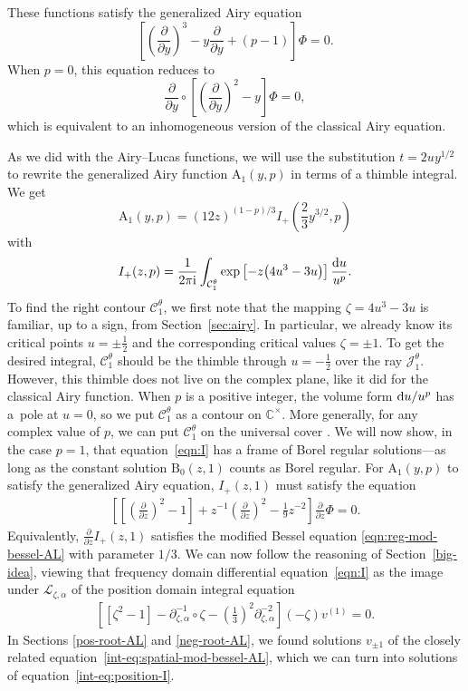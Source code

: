 \documentclass[10pt,a4paper]{amsart}
\newcommand{\C}{\mathbb{C}}
\newcommand{\fracderiv}[3]{\partial^{#1}_{#2, #3}}
\newcommand{\laplace}{\mathcal{L}}
\numberwithin{equation}{section}
\begin{document}
\noindent
These functions satisfy the generalized Airy equation
\[ \left[\left(\frac{\partial}{\partial y}\right)^3 - y \frac{\partial}{\partial y} + (p-1)\right] \Phi = 0. \]
When $p = 0$, this equation reduces to
\[ \frac{\partial}{\partial y} \circ \left[\left(\frac{\partial}{\partial y}\right)^2 - y\right] \Phi = 0, \]
which is equivalent to an inhomogeneous version of the classical Airy equation.



As we did with the Airy--Lucas functions, we will use the substitution $t = 2uy^{1/2}$ to rewrite the generalized Airy function $\mathrm{A}_1(y,p)$ in terms of a thimble integral. We get
\[ \mathrm{A}_1(y,p) = (12 z)^{(1-p)/3} I_+\left(\frac{2}{3}y^{3/2},p\right) \]
with
\[ I_+(z,p) = \frac{1}{2 \pi {\rm i}} \int_{\mathcal{C}^\theta_1} \exp\left[-z\bigl(4u^3 - 3u\bigr)\right] \frac{{\rm d}u}{u^p}. \]
To find the right contour $\mathcal{C}_1^\theta$, we first note that the mapping $\zeta = 4u^3 - 3u$ is familiar, up to a sign, from Section~\ref{sec:airy}. In particular, we already know its critical points $u = \pm\frac{1}{2}$ and the corresponding critical values $\zeta = \pm 1$. To get the desired integral, $\mathcal{C}_1^\theta$ should be the thimble through $u = -\frac{1}{2}$ over the ray $\mathcal{J}^\theta_1$. However, this thimble does not live on the complex plane, like it did for the classical Airy function. When $p$ is a positive integer, the volume form ${\rm d}u/u^p$ has a~pole at $u = 0$, so we put $\mathcal{C}_1^\theta$ as a contour on $\C^\times$. More generally, for any complex value of $p$, we can put $\mathcal{C}_1^\theta$ on the universal cover \smash{$\widetilde{\C^\times}$}. We will now show, in the case $p = 1$, that equation~\eqref{eqn:I} has a frame of Borel regular solutions---as long as the constant solution $\mathrm{B}_0(z, 1)$ counts as Borel regular. For $\mathrm{A}_1(y, p)$ to satisfy the generalized Airy equation, $I_+(z,1)$ must satisfy the equation
\begin{gather}\label{eqn:I}
\left[\left[\left(\frac{\partial}{\partial z}\right)^2 - 1\right] + z^{-1} \left(\frac{\partial}{\partial z}\right)^2 - \frac{1}{9} z^{-2} \right] \frac{\partial}{\partial z} \Phi = 0.
\end{gather}
Equivalently, $\frac{\partial}{\partial z} I_+(z, 1)$ satisfies the modified Bessel equation \eqref{eqn:reg-mod-bessel-AL} with parameter $1/3$. We can now follow the reasoning of Section~\ref{big-idea}, viewing that frequency domain differential equation~\eqref{eqn:I} as the image under $\laplace_{\zeta, \alpha}$ of the position domain integral equation
\begin{gather}\label{int-eq:position-I}
\left[ \left[ \zeta^2 - 1 \right] - \fracderiv{-1}{\zeta}{\alpha} \circ \zeta - \left(\frac{1}{3}\right)^2 \fracderiv{-2}{\zeta}{\alpha} \right] (-\zeta) v^{(1)} = 0.
\end{gather}
In Sections \ref{pos-root-AL} and \ref{neg-root-AL}, we found solutions $v_{\pm 1}$ of the closely related equation~\eqref{int-eq:spatial-mod-bessel-AL}, which we can turn into solutions  of equation~\eqref{int-eq:position-I}.
\end{document}
